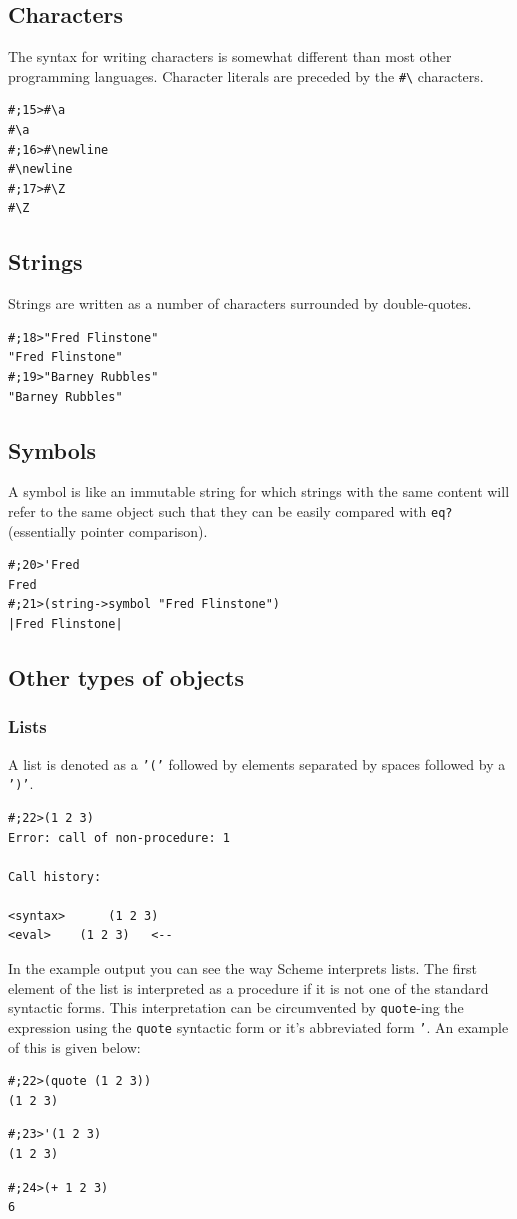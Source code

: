 \documentclass[12pt,a4paper,english,twoside]{article}
\begin{document}
\subsection{Characters}
The syntax for writing characters is somewhat different than most other 
programming languages. Character literals are preceded by the 
\texttt{\#\textbackslash} characters.
\begin{lstlisting}
#;15>#\a
#\a
#;16>#\newline
#\newline
#;17>#\Z
#\Z
\end{lstlisting}
\subsection{Strings}
Strings are written as a number of characters surrounded by double-quotes.
\begin{lstlisting}
#;18>"Fred Flinstone"
"Fred Flinstone"    
#;19>"Barney Rubbles"
"Barney Rubbles"
\end{lstlisting}
\subsection{Symbols}
A symbol is like an immutable string for which strings with the same content 
will refer to the same object such that they can be easily compared with 
\texttt{eq?} (essentially pointer comparison).
\begin{lstlisting}
#;20>'Fred
Fred
#;21>(string->symbol "Fred Flinstone")
|Fred Flinstone|
\end{lstlisting}
\subsection{Other types of objects}
\subsubsection{Lists}
A list is denoted as a \texttt{'('} followed by elements separated by spaces 
followed by a \texttt{')'}.
\begin{lstlisting}
#;22>(1 2 3)
Error: call of non-procedure: 1

Call history:

<syntax>	  (1 2 3)
<eval>	  (1 2 3)	<--

\end{lstlisting}
In the example output you can see the way Scheme interprets lists. The first 
element of the list is interpreted as a procedure if it is not one of the 
standard syntactic forms. This interpretation can be circumvented by 
\texttt{quote}-ing the expression using the \texttt{quote} syntactic form or 
it's abbreviated form \texttt{'}. An example of this is given below:
\begin{lstlisting}
#;22>(quote (1 2 3))
(1 2 3)
\end{lstlisting}
\begin{lstlisting}
#;23>'(1 2 3)
(1 2 3)
\end{lstlisting}
\begin{lstlisting}
#;24>(+ 1 2 3)
6
\end{lstlisting}
\end{document}
